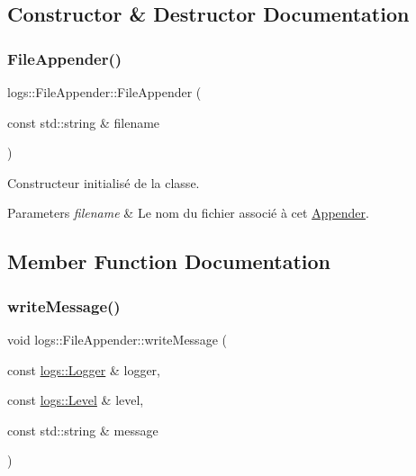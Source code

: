 \subsection{Constructor \& Destructor Documentation}
\mbox{\label{classlogs_1_1FileAppender_a450b9bdc315236b7f1b3d45bf2689c91}} 
\subsubsection{\texorpdfstring{File\+Appender()}{FileAppender()}}
{\footnotesize\ttfamily logs\+::\+File\+Appender\+::\+File\+Appender (\begin{DoxyParamCaption}\item[{const std\+::string \&}]{filename }\end{DoxyParamCaption})\hspace{0.3cm}{\ttfamily [inline]}}



Constructeur initialisé de la classe. 


\begin{DoxyParams}{Parameters}
{\em filename} & Le nom du fichier associé à cet \hyperlink{classlogs_1_1Appender}{Appender}. \\
\hline
\end{DoxyParams}


\subsection{Member Function Documentation}
\mbox{\label{classlogs_1_1FileAppender_ab0dad2dab0f7d659321a574bdfa769c7}} 
\subsubsection{\texorpdfstring{write\+Message()}{writeMessage()}}
{\footnotesize\ttfamily void logs\+::\+File\+Appender\+::write\+Message (\begin{DoxyParamCaption}\item[{const \hyperlink{classlogs_1_1Logger}{logs\+::\+Logger} \&}]{logger,  }\item[{const \hyperlink{classlogs_1_1Level}{logs\+::\+Level} \&}]{level,  }\item[{const std\+::string \&}]{message }\end{DoxyParamCaption})\hspace{0.3cm}{\ttfamily [virtual]}}




